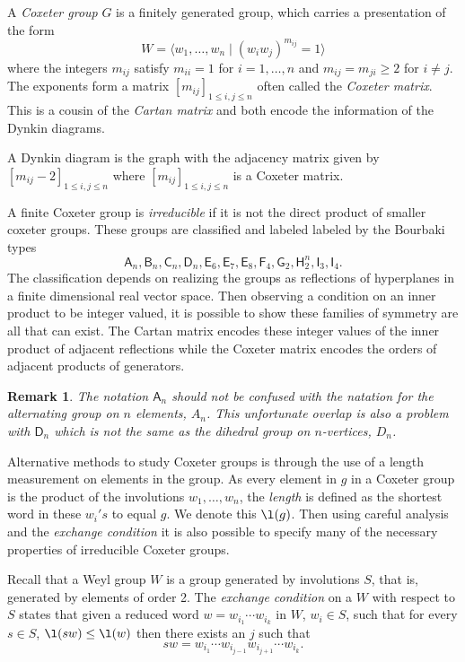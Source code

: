 \documentclass[12pt]{article}
\newtheorem{remark}[thm]{Remark}
\begin{document}
A \emph{Coxeter group} $G$ is a finitely generated group, which carries a presentation of the form
$$
W=\langle w_1,\dots,w_n\mid (w_iw_j)^{m_{ij}}=1\rangle 
$$
where the integers $m_{ij}$ satisfy $m_{ii}=1$ for $i=1,\dots,n$ and $m_{ij}=m_{ji}\ge 2$ for $i\ne j$.  The exponents form a matrix 
$[m_{ij}]_{1\leq i,j\leq n}$ often called the \emph{Coxeter matrix}.
This is a cousin of the \emph{Cartan matrix} and both encode the information
of the Dynkin diagrams.  

A Dynkin diagram is the graph with the adjacency matrix given by 
$[m_{ij}-2]_{1\leq i,j\leq n}$ where $[m_{ij}]_{1\leq i,j\leq n}$ is a
Coxeter matrix.

A finite Coxeter group is \emph{irreducible} if it is not the direct product
of smaller coxeter groups.  These groups are classified and labeled
labeled by the Bourbaki types 
\[\mathsf{A}_n, \mathsf{B}_n, \mathsf{C}_n, 
\mathsf{D}_n, \mathsf{E}_6, \mathsf{E}_7, \mathsf{E}_8, \mathsf{F}_4, 
\mathsf{G}_2, \mathsf{H}_2^n, \mathsf{I}_3,\mathsf{I}_4.\]
The classification depends on realizing the groups as
reflections of hyperplanes in a finite dimensional real vector space.
Then observing a condition on an inner product to be integer valued, it
is possible to show these families of symmetry are all that can exist.
The Cartan matrix encodes these integer values of the inner product
of adjacent reflections while the Coxeter matrix encodes the orders of 
adjacent products of generators.  

\begin{remark}
The notation $\mathsf{A}_n$ should not be confused with the natation for
the alternating group on $n$ elements, $A_n$.  This unfortunate overlap is
also a problem with $\mathsf{D}_n$ which is not the same as the dihedral
group on $n$-vertices, $D_n$.
\end{remark}

Alternative methods to study Coxeter groups is through the use of a length
measurement on elements in the group.  As every element in $g$ in a Coxeter
group is the product of the involutions $w_1,\dots,w_n$, the \emph{length} is defined as the shortest word in these $w_i's$ to equal $g$.  We denote this
$\l(g)$.  Then using careful 
analysis and the \emph{exchange condition} it is also possible to specify many of the necessary properties of irreducible Coxeter groups.

Recall that a Weyl group $W$ is a group generated by involutions $S$, that is,
generated by elements of order 2.  The \emph{exchange condition} on a
$W$ with respect to $S$ states that given a reduced word 
$w=w_{i_1}\cdots w_{i_k}$ in $W$, $w_i\in S$, such that for every $s\in S$,
$\l(sw)\leq \l(w)$ then there exists an $j$ such that
\[sw=w_{i_1}\cdots w_{i_{j-1}}w_{i_{j+1}}\cdots w_{i_k}.\]
\end{document}
